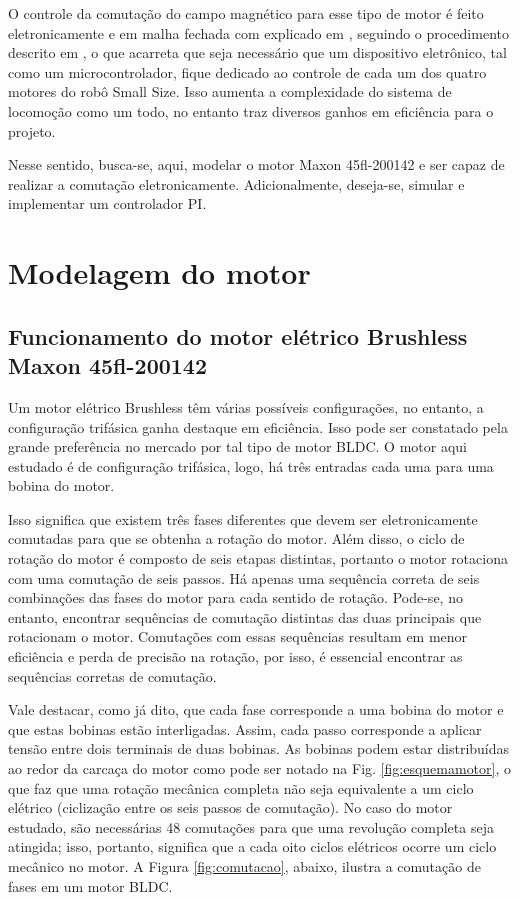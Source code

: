 \documentclass[10pt,fleqn,a4paper]{article}
\begin{document}
    O controle da comutação do campo magnético para esse tipo de motor é feito eletronicamente e em malha fechada com explicado em \cite{ogata1982engenharia}, seguindo o procedimento descrito em \cite{introducaobldc}, o que acarreta que seja necessário que um dispositivo eletrônico, tal como um microcontrolador, fique dedicado ao controle de cada um dos quatro motores do robô Small Size. Isso aumenta a complexidade do sistema de locomoção como um todo, no entanto traz diversos ganhos em eficiência para o projeto.
    
    Nesse sentido, busca-se, aqui, modelar o motor Maxon 45fl-200142 e ser capaz de realizar a comutação eletronicamente. Adicionalmente, deseja-se, simular e implementar um controlador PI.
    
    \section{Modelagem do motor}
    \subsection{Funcionamento do motor elétrico Brushless Maxon 45fl-200142}
    
    Um motor elétrico Brushless têm várias possíveis configurações, no entanto, a configuração trifásica ganha destaque em eficiência. Isso pode ser constatado pela grande preferência no mercado por tal tipo de motor BLDC. O motor aqui estudado é de configuração trifásica, logo, há três entradas cada uma para uma bobina do motor.
    
    Isso significa que existem três fases diferentes que devem ser eletronicamente comutadas para que se obtenha a rotação do motor. Além disso, o ciclo de rotação do motor é composto de seis etapas distintas, portanto o motor rotaciona com uma comutação de seis passos. Há apenas uma sequência correta de seis combinações das fases do motor para cada sentido de rotação. Pode-se, no entanto, encontrar sequências de comutação distintas das duas principais que rotacionam o motor. Comutações com essas sequências resultam em menor eficiência e perda de precisão na rotação, por isso, é essencial encontrar as sequências corretas de comutação.
    
    Vale destacar, como já dito, que cada fase corresponde a uma bobina do motor e que estas bobinas estão interligadas. Assim, cada passo corresponde a aplicar tensão entre dois terminais de duas bobinas. As bobinas podem estar distribuídas ao redor da carcaça do motor como pode ser notado na Fig. \ref{fig:esquemamotor}, o que faz que uma rotação mecânica completa não seja equivalente a um ciclo elétrico (ciclização entre os seis passos de comutação). No caso do motor estudado, são necessárias 48 comutações para que uma revolução completa seja atingida; isso, portanto, significa que a cada oito ciclos elétricos ocorre um ciclo mecânico no motor. A Figura \ref{fig:comutacao}, abaixo, ilustra a comutação de fases em um motor BLDC.
\end{document}
